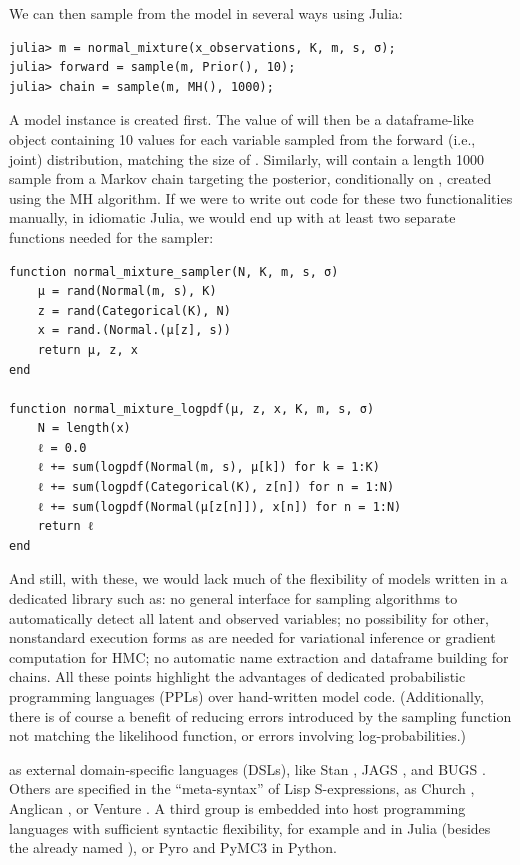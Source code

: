 We can then sample from the model in several ways using Julia:
\begin{lstlisting}
julia> m = normal_mixture(x_observations, K, m, s, σ);
julia> forward = sample(m, Prior(), 10);
julia> chain = sample(m, MH(), 1000);
\end{lstlisting}
A model instance  is created first.  The value of  will then be a
dataframe-like object containing 10 values for each variable sampled from the forward (i.e., joint)
distribution, matching the size of .  Similarly,  will contain a
length 1000 sample from a Markov chain targeting the posterior, conditionally on
, created using the MH algorithm.  If we were to write out code for these two
functionalities manually, in idiomatic Julia, we would end up with at least two separate functions
needed for the sampler:
\begin{lstlisting}
function normal_mixture_sampler(N, K, m, s, σ)
    μ = rand(Normal(m, s), K)
    z = rand(Categorical(K), N)
    x = rand.(Normal.(μ[z], s))
    return μ, z, x
end

function normal_mixture_logpdf(μ, z, x, K, m, s, σ)
    N = length(x)
    ℓ = 0.0
    ℓ += sum(logpdf(Normal(m, s), μ[k]) for k = 1:K)
    ℓ += sum(logpdf(Categorical(K), z[n]) for n = 1:N)
    ℓ += sum(logpdf(Normal(μ[z[n]]), x[n]) for n = 1:N)
    return ℓ
end
\end{lstlisting}
And still, with these, we would lack much of the flexibility of models written in a dedicated
library such as\turingjl: no general interface for sampling algorithms to automatically detect all
latent and observed variables; no possibility for other, nonstandard execution forms as are needed
for variational inference or gradient computation for HMC; no automatic name extraction and
dataframe building for chains.  All these points highlight the advantages of dedicated probabilistic
programming languages (PPLs) over hand-written model code.  (Additionally, there is of course a
benefit of reducing errors introduced by the sampling function not matching the likelihood function,
or errors involving log-probabilities.)

 as external domain-specific languages (DSLs), like Stan
\parencite{carpenter2017stan}, JAGS \parencite{plummer2003jags}, and BUGS
\parencite{lunn2000winbugs,lunn2009bugs}.  Others are specified in the \enquote{meta-syntax} of Lisp
S-expressions, as Church \parencite{goodman2012church}, Anglican \parencite{wood2015new}, or Venture
\parencite{mansinghka2014venture}.  A third group is embedded into host programming languages with
sufficient syntactic flexibility, for example 
\parencite{cusumano-towner2019gen,cusumano-towner2020gen} and 
\parencite{scherrer2019soss} in Julia (besides the already named \turingjl{}), or Pyro
\parencite{bingham2018pyro} and PyMC3 \parencite{salvatier2016probabilistic} in Python.


